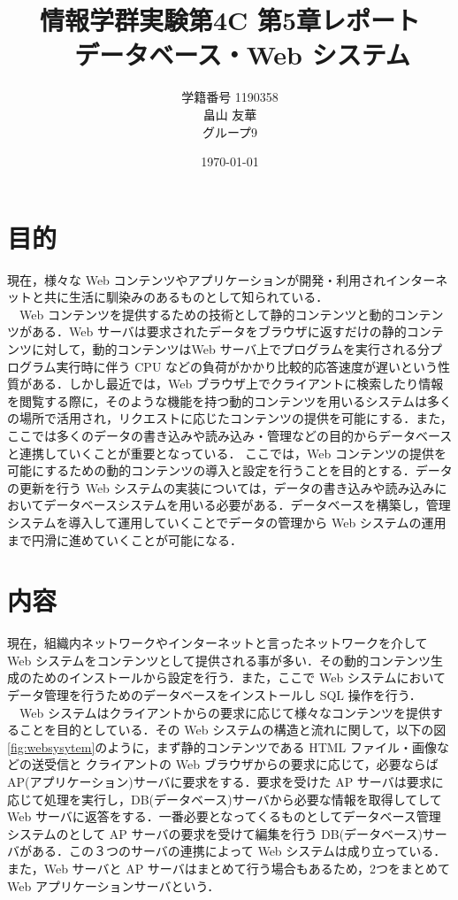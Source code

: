 \documentclass[a4j,titlepage]{jarticle}
\title{情報学群実験第4C 第5章レポート\\　データベース・Web システム}
\author{学籍番号 1190358\\
        畠山 友華\\
        グループ9}
\date{\today}
\begin{document}
\maketitle
\section{目的}
現在，様々な Web コンテンツやアプリケーションが開発・利用されインターネットと共に生活に馴染みのあるものとして知られている．\\
　Web コンテンツを提供するための技術として静的コンテンツと動的コンテンツがある．Web サーバは要求されたデータをブラウザに返すだけの静的コンテンツに対して，動的コンテンツはWeb サーバ上でプログラムを実行される分プログラム実行時に伴う CPU などの負荷がかかり比較的応答速度が遅いという性質がある．しかし最近では，Web ブラウザ上でクライアントに検索したり情報を閲覧する際に，そのような機能を持つ動的コンテンツを用いるシステムは多くの場所で活用され，リクエストに応じたコンテンツの提供を可能にする．また，ここでは多くのデータの書き込みや読み込み・管理などの目的からデータベースと連携していくことが重要となっている．
ここでは，Web コンテンツの提供を可能にするための動的コンテンツの導入と設定を行うことを目的とする．データの更新を行う Web システムの実装については，データの書き込みや読み込みにおいてデータベースシステムを用いる必要がある．データベースを構築し，管理システムを導入して運用していくことでデータの管理から Web システムの運用まで円滑に進めていくことが可能になる．


\section{内容}
現在，組織内ネットワークやインターネットと言ったネットワークを介して Web システムをコンテンツとして提供される事が多い．その動的コンテンツ生成のためのインストールから設定を行う．また，ここで Web システムにおいてデータ管理を行うためのデータベースをインストールし SQL 操作を行う．\\
　Web システムはクライアントからの要求に応じて様々なコンテンツを提供することを目的としている．その Web システムの構造と流れに関して，以下の図\ref{fig:websysytem}のように，まず静的コンテンツである HTML ファイル・画像などの送受信と クライアントの Web ブラウザからの要求に応じて，必要ならばAP(アプリケーション)サーバに要求をする．要求を受けた AP サーバは要求に応じて処理を実行し，DB(データベース)サーバから必要な情報を取得してして Web サーバに返答をする．一番必要となってくるものとしてデータベース管理システムのとして AP サーバの要求を受けて編集を行う DB(データベース)サーバがある．この３つのサーバの連携によって Web システムは成り立っている．また，Web サーバと AP サーバはまとめて行う場合もあるため，2つをまとめて Web アプリケーションサーバという．
\end{document}
